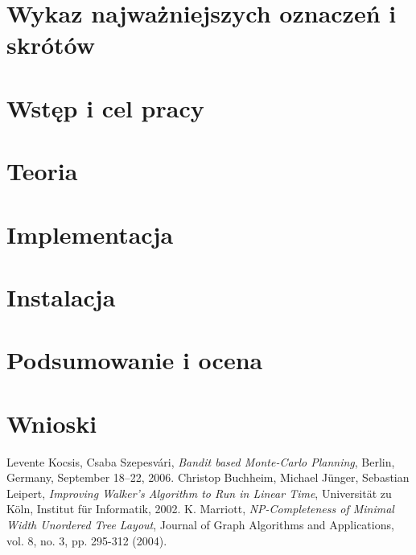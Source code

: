 \documentclass[a4paper,11pt,twoside]{report}
\theoremstyle{definition}
\begin{document}
\chapter{Wykaz najważniejszych oznaczeń i skrótów}


\chapter{Wstęp i cel pracy}


\chapter{Teoria}


\chapter{Implementacja}


\chapter{Instalacja}


\chapter{Podsumowanie i ocena}


\chapter{Wnioski}



\begin{thebibliography}{20}%
 Levente Kocsis, Csaba Szepesvári, \emph{Bandit based Monte-Carlo Planning}, Berlin, Germany, September 18–22, 2006.
 Christop Buchheim, Michael Jünger, Sebastian Leipert, \emph{Improving Walker's Algorithm to Run in Linear Time}, Universität zu Köln, Institut für Informatik, 2002.
 K. Marriott, \emph{NP-Completeness of Minimal Width Unordered Tree Layout}, Journal of Graph Algorithms and Applications, vol. 8, no. 3, pp. 295-312 (2004).
\end{thebibliography}
\end{document}
